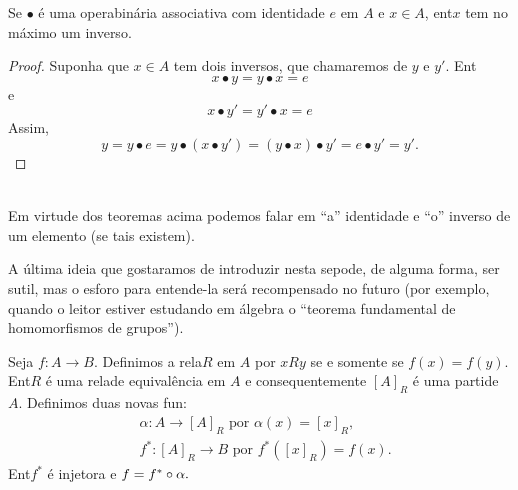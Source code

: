 \begin{teob}\label{functeo20}
Se $\bullet$ \'e uma opera\cao bin\'aria associativa com identidade $e$ em $A$ e $x\in A$, ent\ao $x$ tem no m\'aximo um inverso.
\end{teob}
\begin{proof}
Suponha que $x\in A$ tem dois inversos, que chamaremos de $y$ e $y'$. Ent\ao
\[
x\bullet y=y\bullet x=e
\]
e
\[
x\bullet y'=y'\bullet x=e
\]
Assim,
\[
y=y\bullet e=y\bullet(x\bullet y')=(y\bullet x)\bullet y'=e\bullet y'=y'.
\]
\end{proof}
\\

Em virtude dos teoremas acima podemos falar em ``a'' identidade e ``o'' inverso de um elemento (se tais existem).

A \'ultima ideia que gostar\ih amos de introduzir nesta se\cao pode, de alguma forma, ser sutil, mas o esfor\cc o para entende-la ser\'a recompensado no futuro (por exemplo, quando o leitor estiver estudando em \'algebra o ``teorema fundamental de homomorfismos de grupos'').
\begin{teob}\label{functeo21}
Seja $f:A\to B$. Definimos a rela\cao $R$ em $A$ por $xRy$ se e somente se $f(x)=f(y)$. Ent\ao $R$ \'e uma rela\cao de equival\^encia em $A$ e consequentemente $[A]_R$ \'e uma parti\cao de $A$. Definimos duas novas fun\cois:
\begin{equation*}
 \begin{aligned}
&\alpha:A\to[A]_R \textrm{ por } \alpha(x)=[x]_R,\\
&f^{\ast}:[A]_R\to B \textrm{ por } f^{\ast}([x]_R)=f(x). 
 \end{aligned}
\end{equation*}
Ent\ao $f^{\ast}$ \'e injetora e $f=f^{\ast}\circ\alpha.$
\end{teob}
